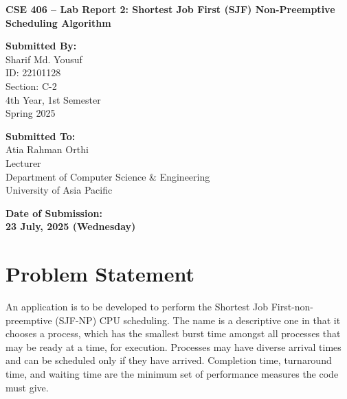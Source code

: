 \documentclass[12pt,a4paper]{article}
\begin{document}
\begin{titlepage}
  \centering
  \vspace*{3cm}

  {\Huge\bfseries CSE 406 – Lab Report 2: Shortest Job First (SJF) Non-Preemptive Scheduling Algorithm \par}
  \vspace{2.5cm}

  \noindent
  \begin{minipage}[t]{0.48\textwidth}
    {\large\bfseries Submitted By:}\\[0.5em]
    \Large
    Sharif Md. Yousuf \\
    ID: 22101128 \\
    Section: C-2 \\
    4th Year, 1st Semester \\
    Spring 2025
  \end{minipage}
  \hfill
  \begin{minipage}[t]{0.48\textwidth}
    {\large\bfseries Submitted To:}\\[0.5em]
    \Large
    Atia Rahman Orthi \\
    Lecturer \\
    Department of Computer Science \& Engineering \\
    University of Asia Pacific
  \end{minipage}

  \vfill

  {\Large\bfseries Date of Submission:} \\[0.5em]
  {\LARGE\bfseries 23 July, 2025 (Wednesday)}

  \vspace*{2cm}
\end{titlepage}

\section{Problem Statement}
An application is to be developed to perform the Shortest Job First-non-preemptive (SJF-NP) CPU scheduling. The name is a descriptive one in that it chooses a process, which has the smallest burst time amongst all processes that may be ready at a time, for execution. Processes may have diverse arrival times and can be scheduled only if they have arrived. Completion time, turnaround time, and waiting time are the minimum set of performance measures the code must give.
\end{document}
